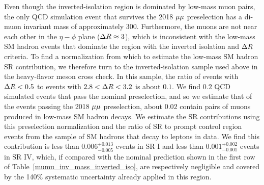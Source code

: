 

Even though the inverted-isolation region is dominated by low-mass muon pairs, the only QCD simulation event that survives the 2018 ${\mu}{\mu}$ preselection has a di-muon invariant mass of approximately 300\GeV. Furthermore, the muons are not near each other in the $\eta-\phi$ plane ($\Delta R\approx3$), which is inconsistent with the low-mass SM hadron events that dominate the region with the inverted isolation and $\Delta R$ criteria. To find a normalization from which to estimate the low-mass SM hadron SR contribution, we therefore turn to the inverted-isolation sample used above in the heavy-flavor meson cross check. In this sample, the ratio of events with $\Delta R<0.5$ to events with $2.8<\Delta R<3.2$ is about $0.1$. We find $0.2$ QCD simulated events that pass the nominal preselection, and so we estimate that of the events passing the 2018 ${\mu}{\mu}$ preselection, about $0.02$ contain pairs of muons produced in low-mass SM hadron decays. We estimate the SR contributions using this preselection normalization and the ratio of SR to prompt control region events from the sample of SM hadrons that decay to leptons in data. We find this contribution is less than $0.006^{+0.013}_{-0.005}$ events in SR I and less than $0.001^{+0.002}_{-0.001}$ events in SR IV, which, if compared with the nominal prediction shown in the first row of Table~\ref{mumu_inv_mass_inverted_iso}, are respectively negligible and covered by the 140\% systematic uncertainty already applied in this region.


\pagebreak